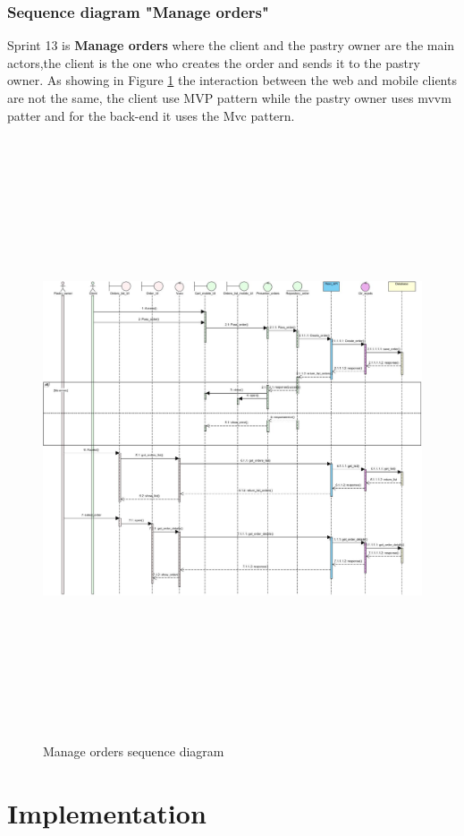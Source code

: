 \documentclass[12pt,a4paper]{report}
\begin{document}
\subsubsection*{Sequence diagram "Manage orders"}
Sprint 13 is \textbf{Manage orders} where the client and the pastry owner are the main actors,the client is the one who creates the order and sends it to the pastry owner. As showing in Figure \ref{orders-sequence} the interaction between the web and mobile clients are not the same, the client use MVP pattern while the pastry owner uses \ac{mvvm} patter and for the back-end it uses the Mvc pattern.
\begin{figure}[H]
	\centering
	\includegraphics[width=7in,height=7in]{manageOrdersSeq.jpg}
	\caption{Manage orders sequence diagram}
	\label{orders-sequence}
\end{figure}
	\section{Implementation}
\end{document}
